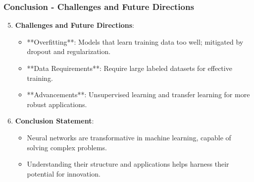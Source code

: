 \documentclass[aspectratio=169]{beamer}
\begin{document}
\begin{frame}[fragile]
    \frametitle{Conclusion - Challenges and Future Directions}
    \begin{enumerate}
        \setcounter{enumi}{4} %
        \item \textbf{Challenges and Future Directions}:
        \begin{itemize}
            \item **Overfitting**: Models that learn training data too well; mitigated by dropout and regularization.
            \item **Data Requirements**: Require large labeled datasets for effective training.
            \item **Advancements**: Unsupervised learning and transfer learning for more robust applications.
        \end{itemize}
        
        \item \textbf{Conclusion Statement}:
        \begin{itemize}
            \item Neural networks are transformative in machine learning, capable of solving complex problems.
            \item Understanding their structure and applications helps harness their potential for innovation.
        \end{itemize}
    \end{enumerate}
\end{frame}
\end{document}
